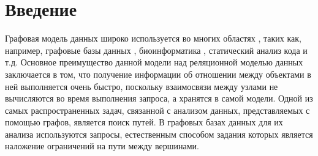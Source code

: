 \documentclass[14pt]{matmex-diploma-custom}
\theoremstyle{definition}
\begin{document}
\maketitle
\tableofcontents
\section*{Введение}
Графовая модель данных широко используется во многих областях \cite{robinson2015graph}, таких как, например, графовые базы данных \cite{10.1145/2463664.2465216}, биоинформатика \cite{rna}, статический анализ кода \cite{10.1145/2499370.2462159} и т.д. Основное преимущество данной модели над реляционной моделью данных заключается в том, что получение информации об отношении между объектами в ней выполняется очень быстро, поскольку взаимосвязи между узлами не вычисляются во время выполнения запроса, а хранятся в самой модели. Одной из самых распространенных задач, связанной с анализом данных, представляемых с помощью графов, является поиск путей. В графовых базах данных для их анализа используются запросы, естественным способом задания которых является наложение ограничений на пути между вершинами.
\end{document}
